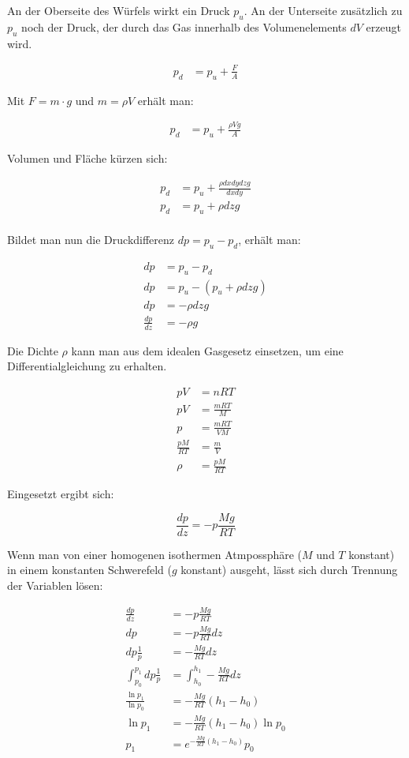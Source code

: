 \documentclass[a4paper,german,12pt,smallheadings]{scrartcl}
\begin{document}
An der Oberseite des Würfels wirkt ein Druck $p_{u}$. An der Unterseite
zusätzlich zu $p_{u}$ noch der Druck, der durch das Gas innerhalb des
Volumenelements $dV$ erzeugt wird.

\begin{align*}
  p_d &= p_u + \frac{F}{A}
\end{align*}

Mit $F = m \cdot g$ und $m = \rho V$ erhält man:

\begin{align*}
  p_d &= p_u + \frac{\rho V g}{A}
\end{align*}

Volumen und Fläche kürzen sich:

\begin{align*}
  p_d &= p_u + \frac{\rho dxdydz g}{dxdy} \\
  p_d &= p_u + \rho dz g \\
\end{align*}

Bildet man nun die Druckdifferenz $dp = p_u - p_d$, erhält man:

\begin{align*}
  dp &= p_u - p_d \\
  dp &= p_u - (p_u + \rho dz g) \\
  dp &= - \rho dz g \\
  \frac{dp}{dz} &= - \rho g
\end{align*}

Die Dichte $\rho$ kann man aus dem idealen Gasgesetz einsetzen, um eine Differentialgleichung zu erhalten.

\begin{align*}
  pV &= nRT \\
  pV &= \frac{mRT}{M} \\
  p &= \frac{mRT}{VM} \\
  \frac{pM}{RT} &= \frac{m}{V} \\
  \rho &= \frac{pM}{RT}
\end{align*}

Eingesetzt ergibt sich:

\begin{equation}
  \frac{dp}{dz} = -p \frac{Mg}{RT}
\end{equation}

Wenn man von einer homogenen isothermen Atmpossphäre ($M$ und $T$ konstant) in
einem konstanten Schwerefeld ($g$ konstant) ausgeht, lässt sich durch Trennung
der Variablen lösen:

\begin{align*}
  \frac{dp}{dz} &= -p \frac{Mg}{RT} \\
  dp &= -p \frac{Mg}{RT} dz \\
  dp \frac{1}{p} &= -\frac{Mg}{RT} dz \\
  \int_{p_0}^{p_1} dp \frac{1}{p} &= \int_{h_0}^{h_1} -\frac{Mg}{RT} dz \\
  \frac{\ln p_1}{\ln p_0} &= -\frac{Mg}{RT} (h_1 - h_0) \\
  \ln p_1 &= - \frac{Mg}{RT} (h_1 - h_0) \ln p_0 \\
   p_1 &= e^{- \frac{Mg}{RT} (h_1 - h_0)} p_0 \\
\end{align*}
\end{document}

